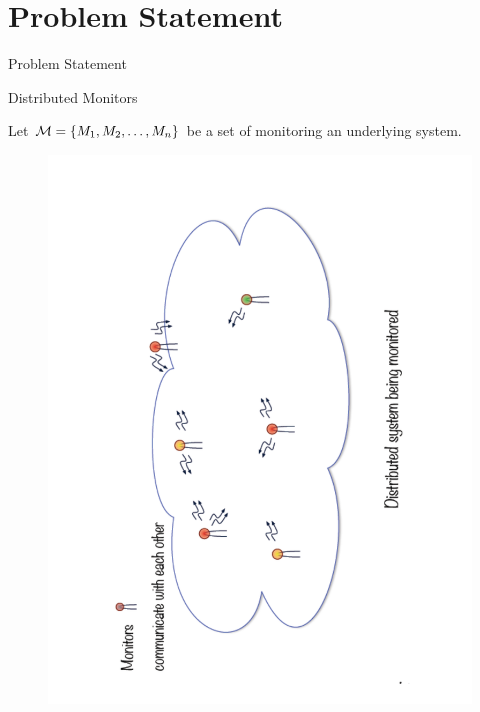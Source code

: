 \section{Problem Statement}



\begin{frame}{Problem Statement}
 
\begin{block}{Distributed Monitors}
 
Let $\mathcal{M} = \{M_1, M_2, \ldots, M_n\}$ be a set of  monitoring an underlying system. 

\end{block}

\vspace{-10mm}
\begin{figure}
 \centering
 \includegraphics[scale=.29, angle=-90]{figures/wfdm}
 \end{figure}

\end{frame}
 
